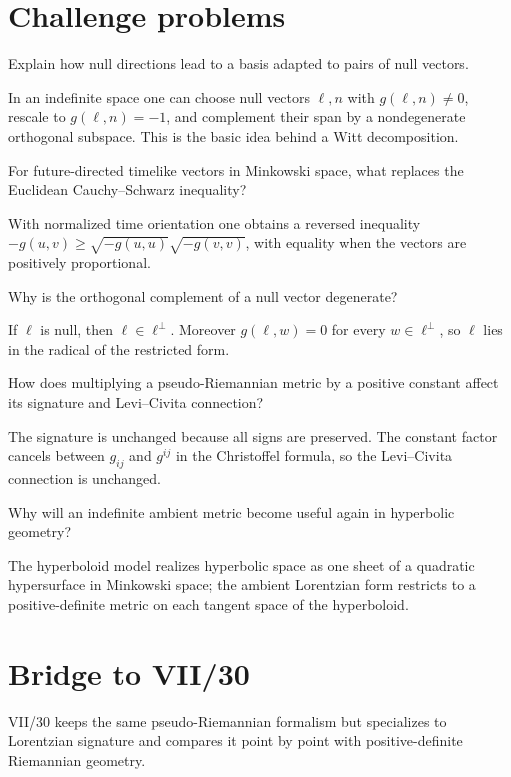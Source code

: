 \section{Challenge problems}
\begin{problem}\label{prob:vii29-ch01}
Explain how null directions lead to a basis adapted to pairs of null vectors.
\end{problem}
\begin{solution}
In an indefinite space one can choose null vectors \(\ell,n\) with \(g(\ell,n)\ne0\), rescale to \(g(\ell,n)=-1\), and complement their span by a nondegenerate orthogonal subspace. This is the basic idea behind a Witt decomposition.
\end{solution}

\begin{problem}\label{prob:vii29-ch02}
For future-directed timelike vectors in Minkowski space, what replaces the Euclidean Cauchy--Schwarz inequality?
\end{problem}
\begin{solution}
With normalized time orientation one obtains a reversed inequality \(-g(u,v)\ge\sqrt{-g(u,u)}\sqrt{-g(v,v)}\), with equality when the vectors are positively proportional.
\end{solution}

\begin{problem}\label{prob:vii29-ch03}
Why is the orthogonal complement of a null vector degenerate?
\end{problem}
\begin{solution}
If \(\ell\) is null, then \(\ell\in\ell^\perp\). Moreover \(g(\ell,w)=0\) for every \(w\in\ell^\perp\), so \(\ell\) lies in the radical of the restricted form.
\end{solution}

\begin{problem}\label{prob:vii29-ch04}
How does multiplying a pseudo-Riemannian metric by a positive constant affect its signature and Levi--Civita connection?
\end{problem}
\begin{solution}
The signature is unchanged because all signs are preserved. The constant factor cancels between \(g_{ij}\) and \(g^{ij}\) in the Christoffel formula, so the Levi--Civita connection is unchanged.
\end{solution}

\begin{problem}\label{prob:vii29-ch05}
Why will an indefinite ambient metric become useful again in hyperbolic geometry?
\end{problem}
\begin{solution}
The hyperboloid model realizes hyperbolic space as one sheet of a quadratic hypersurface in Minkowski space; the ambient Lorentzian form restricts to a positive-definite metric on each tangent space of the hyperboloid.
\end{solution}

\section*{Bridge to VII/30}
VII/30 keeps the same pseudo-Riemannian formalism but specializes to Lorentzian signature and compares it point by point with positive-definite Riemannian geometry.
